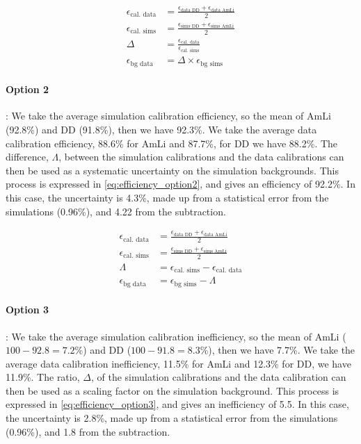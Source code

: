 \begin{align}
	\epsilon_{\textrm{cal. data}} & = \frac{\epsilon_{\textrm{data DD}} + \epsilon_{\textrm{data AmLi}}}{2} \\
	\epsilon_{\textrm{cal. sims}} & = \frac{\epsilon_{\textrm{sims DD}} + \epsilon_{\textrm{sims AmLi}}}{2} \\
	\Delta                        & = \frac{\epsilon_{\textrm{cal. data}}}{\epsilon_{\textrm{cal. sims}}}   \\
	\epsilon_{\textrm{bg data}}   & = \Delta \times \epsilon_{\textrm{bg sims}}
	\label{eq:efficiency_option1}
\end{align}

\paragraph{Option 2}:
We take the average simulation calibration efficiency, so the mean of AmLi (92.8\%) and DD (91.8\%), then we have 92.3\%.
We take the average data calibration efficiency, 88.6\% for AmLi and 87.7\%, for DD we have 88.2\%.
The difference, $\Lambda$, between the simulation calibrations and the data calibrations can then be used as a systematic uncertainty on the simulation backgrounds.
This process is expressed in \autoref{eq:efficiency_option2}, and gives an efficiency of 92.2\%.
In this case, the uncertainty is 4.3\%, made up from a statistical error from the simulations (0.96\%), and 4.22 from the subtraction.

\begin{align}
	\epsilon_{\textrm{cal. data}} & = \frac{\epsilon_{\textrm{data DD}} + \epsilon_{\textrm{data AmLi}}}{2} \\
	\epsilon_{\textrm{cal. sims}} & = \frac{\epsilon_{\textrm{sims DD}} + \epsilon_{\textrm{sims AmLi}}}{2} \\
	\Lambda                       & = \epsilon_{\textrm{cal. sims}} - \epsilon_{\textrm{cal. data}}         \\
	\epsilon_{\textrm{bg data}}   & = \epsilon_{\textrm{bg sims}} - \Lambda
	\label{eq:efficiency_option2}
\end{align}

\paragraph{Option 3}:
We take the average simulation calibration inefficiency, so the mean of AmLi ($100 - 92.8 = 7.2$\%) and DD ($100 - 91.8 = 8.3$\%), then we have 7.7\%.
We take the average data calibration inefficiency, 11.5\% for AmLi and 12.3\% for DD, we have 11.9\%.
The ratio, $\Delta$, of the simulation calibrations and the data calibration can then be used as a scaling factor on the simulation background.
This process is expressed in \autoref{eq:efficiency_option3}, and gives an inefficiency of 5.5.
In this case, the uncertainty is 2.8\%, made up from a statistical error from the simulations (0.96\%), and 1.8 from the subtraction.

